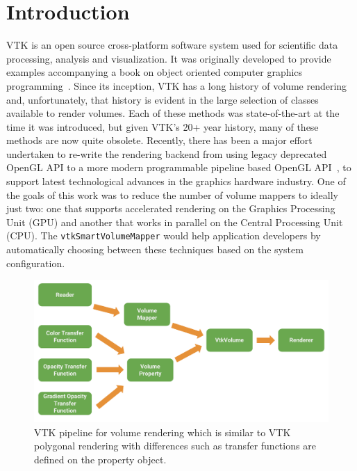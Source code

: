 \section{Introduction}
\label{introduction}
VTK is an open source cross-platform software system used for scientific data
processing, analysis and visualization. It was originally developed to provide
examples accompanying a book on object oriented computer graphics
programming~\citep{schroeder_visualization_2006, geveci_vtk_2012}.  Since its
inception, VTK has a long history of volume rendering and, unfortunately, that
history is evident in the large selection of classes available to render
volumes. Each of these methods was state-of-the-art at the time it was
introduced, but given VTK's 20+ year history, many of these methods are now
quite obsolete. Recently, there has been a major
effort~\citep{hanwell_visualization_2015} undertaken to re-write the rendering
backend from using legacy deprecated OpenGL API to a more modern programmable
pipeline based OpenGL API~\citep{shreiner_opengl_2013}, to support latest
technological advances in the graphics hardware industry. One of the goals of
this work was to reduce the number of volume mappers to ideally just two: one
that supports accelerated rendering on the Graphics Processing Unit (GPU) and
another that works in parallel on the Central Processing Unit (CPU). The
\texttt{vtkSmartVolumeMapper} would help application developers by automatically
choosing between these techniques based on the system configuration. 

\begin{figure}[ht]
  \centering
  \includegraphics[width=\columnwidth]{vtk_volume_pipeline.pdf}
  \caption{VTK pipeline for volume rendering which is similar to VTK polygonal
    rendering with differences such as transfer functions are defined on the
    property object.}
  \label{fig:pipeline}
\end{figure}%

